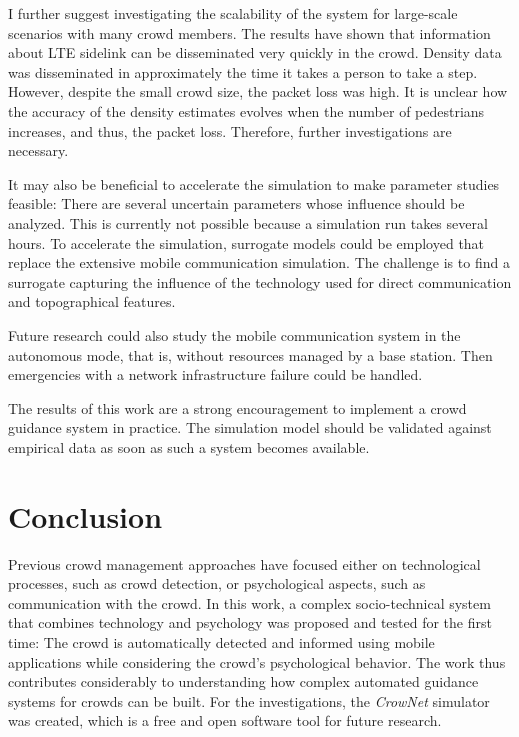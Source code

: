 I further suggest investigating the scalability of the system for large-scale scenarios with many crowd members. The results have shown that information about LTE sidelink can be disseminated very quickly in the crowd. Density data was disseminated in approximately the time it takes a person to take a step. However, despite the small crowd size, the packet loss was high. It is unclear how the accuracy of the density estimates evolves when the number of pedestrians increases, and thus, the packet loss. Therefore, further investigations are necessary.

It may also be beneficial to accelerate the simulation to make parameter studies feasible: There are several uncertain parameters whose influence should be analyzed. This is currently not possible because a simulation run takes several hours. To accelerate the simulation, surrogate models  could be employed that replace the extensive mobile communication simulation. The challenge is to find a surrogate capturing the influence of the technology used for direct communication and topographical features.

Future research could also study the mobile communication system in the autonomous mode, that is, without resources managed by a base station. Then emergencies with a network infrastructure failure could be handled.

The results of this work are a strong encouragement to implement a crowd guidance system in practice. The simulation model should be validated against empirical data as soon as such a system becomes available.


\section{Conclusion}
\label{sec:conclusion}


Previous crowd management approaches have focused either on technological processes, such as crowd detection, or psychological aspects, such as communication with the crowd. 
In this work,  a complex socio-technical system that combines technology and psychology was proposed and tested for the first time: The crowd is automatically detected and informed using mobile applications while considering the crowd's psychological behavior. 
The work thus contributes considerably to understanding how complex automated guidance systems for crowds can be built. 
For the investigations, the \textit{CrowNet} simulator was created, which is a free and open software tool for future research.



